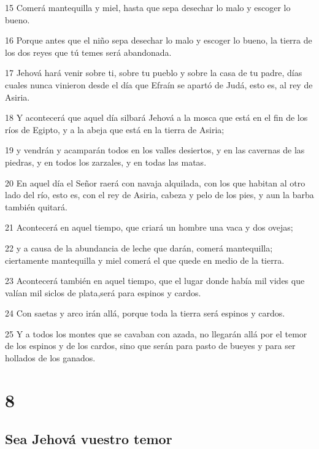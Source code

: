 \par 15 Comerá mantequilla y miel, hasta que sepa desechar lo malo y escoger lo bueno.
\par 16 Porque antes que el niño sepa desechar lo malo y escoger lo bueno, la tierra de los dos reyes que tú temes será abandonada.
\par 17 Jehová hará venir sobre ti, sobre tu pueblo y sobre la casa de tu padre, días cuales nunca vinieron desde el día que Efraín se apartó de Judá, esto es, al rey de Asiria.
\par 18 Y acontecerá que aquel día silbará Jehová a la mosca que está en el fin de los ríos de Egipto, y a la abeja que está en la tierra de Asiria;
\par 19 y vendrán y acamparán todos en los valles desiertos, y en las cavernas de las piedras, y en todos los zarzales, y en todas las matas.
\par 20 En aquel día el Señor raerá con navaja alquilada, con los que habitan al otro lado del río, esto es, con el rey de Asiria, cabeza y pelo de los pies, y aun la barba también quitará.
\par 21 Acontecerá en aquel tiempo, que criará un hombre una vaca y dos ovejas;
\par 22 y a causa de la abundancia de leche que darán, comerá mantequilla; ciertamente mantequilla y miel comerá el que quede en medio de la tierra.
\par 23 Acontecerá también en aquel tiempo, que el lugar donde había mil vides que valían mil siclos de plata,será para espinos y cardos.
\par 24 Con saetas y arco irán allá, porque toda la tierra será espinos y cardos.
\par 25 Y a todos los montes que se cavaban con azada, no llegarán allá por el temor de los espinos y de los cardos, sino que serán para pasto de bueyes y para ser hollados de los ganados.

\chapter{8}

\section*{Sea Jehová vuestro temor}

